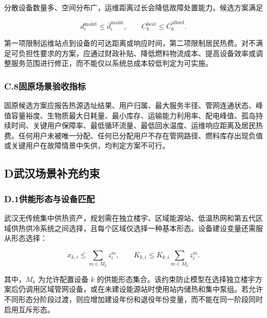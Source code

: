 分散设备数量多、空间分布广，运维距离过长会降低故障处置能力。候选方案满足

\begin{equation}
d_i^{\mathrm{maint}}\leq\overline d_i^{\mathrm{maint}},
\qquad
C_b^{\mathrm{heat}}\leq\overline C_b^{\mathrm{afford}}.
\label{eq:guyuan_maintain_afford}
\end{equation}

第一项限制运维站点到设备的可达距离或响应时间，第二项限制居民热费。对不满足可负担性要求的方案，应通过财政补贴、降低燃料物流成本、提高设备效率或调整服务范围进行修正，而不能仅以系统总成本较低判定为可实施。

\subsubsection*{C.8\quad 固原场景验收指标}

固原候选方案应报告热源选址结果、用户归属、最大服务半径、管网连通状态、峰值容量裕度、生物质最大日耗量、最小库存、运输能力利用率、配电峰值、孤岛持续时间、关键用户保障率、最低循环流量、最低回水温度、运维响应距离及居民热费。任何用户未被唯一分配、任何已分配用户不存在管网路径、燃料库存出现负值或关键用户在故障情景中失供，均判定方案不可行。

\clearpage

\subsection*{D\quad 武汉场景补充约束}
\label{app:wuhan}

\subsubsection*{D.1\quad 供能形态与设备匹配}

武汉无传统集中供热资产，规划需在独立楼宇、区域能源站、低温热网和第五代区域供热供冷系统之间选择，且每个区域仅选择一种基本形态。设备建设变量还需服从形态选择：

\begin{equation}
x_{k,i}\leq\sum_{m\in M_k}z_i^m,
\qquad
K_{k,i}\leq\overline K_{k,i}\sum_{m\in M_k}z_i^m.
\label{eq:wuhan_equipment_match}
\end{equation}

其中，$M_k$ 为允许配置设备 $k$ 的供能形态集合。该约束防止模型在选择独立楼宇方案后仍调用区域管网设备，或在未建设能源站时使用站内储热和集中泵组。若允许不同形态分阶段过渡，则应增加建设年份和退役年份变量，而不能在同一阶段同时启用互斥形态。

